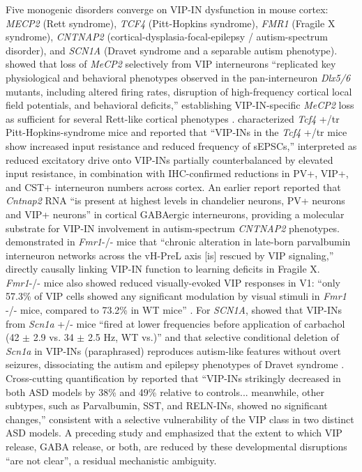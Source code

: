 \documentclass[11pt]{article}
\begin{document}
Five monogenic disorders converge on VIP-IN dysfunction in mouse cortex:
\textit{MECP2} (Rett syndrome), \textit{TCF4} (Pitt-Hopkins syndrome), \textit{FMR1} (Fragile X
syndrome), \textit{CNTNAP2} (cortical-dysplasia-focal-epilepsy / autism-spectrum
disorder), and \textit{SCN1A} (Dravet syndrome and a separable autism phenotype).
\citet{Mossner2020} showed that loss of \textit{MeCP2} selectively from VIP
interneurons ``replicated key physiological and behavioral phenotypes
observed in the pan-interneuron \textit{Dlx5/6} mutants, including altered firing
rates, disruption of high-frequency cortical local field potentials, and
behavioral deficits,'' establishing VIP-IN-specific \textit{MeCP2} loss as
sufficient for several Rett-like cortical phenotypes
\citep{Mossner2020, Ferguson2023b, Simacek2025b, Goff2021}. \citet{Chen2023b}
characterized \textit{Tcf4} +/tr Pitt-Hopkins-syndrome mice and reported that
``VIP-INs in the \textit{Tcf4} +/tr mice show increased input resistance and
reduced frequency of sEPSCs,'' interpreted as reduced excitatory drive
onto VIP-INs partially counterbalanced by elevated input resistance, in
combination with IHC-confirmed reductions in PV+, VIP+, and CST+
interneuron numbers across cortex. An earlier report reported that \textit{Cntnap2}
RNA ``is present at highest levels in chandelier neurons, PV+ neurons and
VIP+ neurons'' in cortical GABAergic interneurons, providing a molecular
substrate for VIP-IN involvement in autism-spectrum \textit{CNTNAP2} phenotypes.
\citet{Bhandari2024} demonstrated in \textit{Fmr1}-/- mice that ``chronic
alteration in late-born parvalbumin interneuron networks across the
vH-PreL axis [is] rescued by VIP signaling,'' directly causally linking
VIP-IN function to learning deficits in Fragile X. \textit{Fmr1}-/- mice also
showed reduced visually-evoked VIP responses in V1: ``only 57.3\% of VIP
cells showed any significant modulation by visual stimuli in \textit{Fmr1} -/-
mice, compared to 73.2\% in WT mice'' \citep{Rahmatullah2023}.
For \textit{SCN1A}, \citet{Goff2023} showed that VIP-INs from \textit{Scn1a} +/- mice
``fired at lower frequencies before application of carbachol (42 $\pm$ 2.9 vs.
34 $\pm$ 2.5 Hz, WT vs.)'' and that selective conditional deletion of \textit{Scn1a} in VIP-INs (paraphrased) reproduces autism-like features without overt seizures, dissociating the autism and
epilepsy phenotypes of Dravet syndrome
\citep{Goff2023, Vormsteinschneider2020}. Cross-cutting
quantification by \citet{Hanno2026} reported that ``VIP-INs strikingly
decreased in both ASD models by 38\% and 49\% relative to controls...
meanwhile, other subtypes, such as Parvalbumin, SST, and RELN-INs, showed
no significant changes,'' consistent with a selective vulnerability of the
VIP class in two distinct ASD models. A preceding study and
\citet{Kaneko2024} emphasized that the extent to which VIP release,
GABA release, or both, are reduced by these developmental disruptions
``are not clear'', a residual mechanistic ambiguity.
\end{document}
